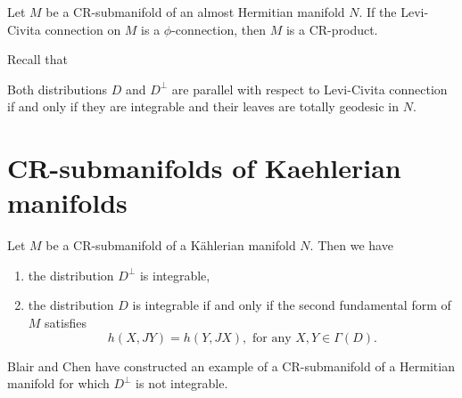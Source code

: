 \begin{theorem}
    Let \( M \) be a CR-submanifold of an 
almost Hermitian manifold \( N \). If the Levi-Civita connection 
on \( M \) is a \( \phi \)-connection, then \( M \) is a CR-product.
\end{theorem}
Recall that
\begin{theorem}
    Both distributions $D$ and $D^{\perp}$ are parallel with respect to Levi-Civita connection  if and only if they are integrable and their leaves are totally geodesic in $N$.
\end{theorem}

\section{CR-submanifolds of Kaehlerian manifolds}

\begin{theorem}
  Let \( M \) be a CR-submanifold of a K\"ahlerian manifold \( N \). Then we have
\begin{enumerate}
    \item[(i)] the distribution \( D^{\perp} \) is integrable,
    \item[(ii)] the distribution \( D \) is integrable if and only if the second fundamental form of \( M \) satisfies
    \[
    h(X, JY) = h(Y, JX), \text{ for any } X, Y \in \Gamma(D).
    \]
\end{enumerate}
\end{theorem}
\begin{remark}
    Blair and Chen have constructed  an example of a CR-submanifold of a Hermitian manifold for which $D^{\perp}$ is not integrable.
\end{remark}



